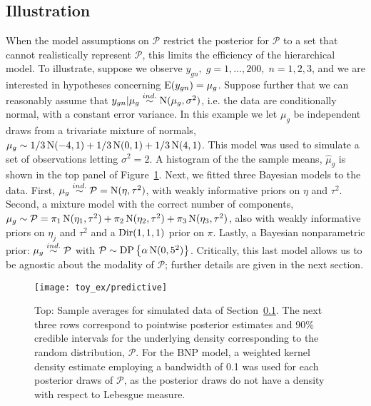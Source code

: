 \subsection{Illustration}
\label{subsec:illustration}
When the model assumptions on $\mathcal{P}$ restrict the posterior for $\mathcal{P}$ to a set that cannot realistically represent $\mathcal{P}$, this limits the efficiency of the hierarchical model. To illustrate, suppose we observe $y_{gn},\; g=1,\ldots,200,\;n=1,2,3$, and we are interested in hypotheses concerning $\operatorname{E}(y_{gn})=\mu_g$. Suppose further that we can reasonably assume that $y_{gn}|\mu_g \stackrel{ind.}{\sim} \operatorname{N}(\mu_g,\sigma^2)$, i.e. the data are conditionally normal, with a constant error variance. In this example we let $\mu_g$ be independent draws from a trivariate mixture of normals, $\mu_g \sim 1/3\operatorname{N}(-4,1)+1/3\operatorname{N}(0,1)+1/3\operatorname{N}(4,1)$. This model was used to simulate a set of observations letting $\sigma^2=2$. A histogram of the the sample means, $\hat{\mu}_g$ is shown in the top panel of Figure~\ref{predictive}. Next, we fitted three Bayesian models to the data. First, $\mu_g \stackrel{ind.}{\sim} \mathcal{P}=\operatorname{N}(\eta, \tau^2)$, with weakly informative priors on $\eta$ and $\tau^2$. Second, a mixture model with the correct number of components, $\mu_g \sim \mathcal{P}=\pi_1\operatorname{N}(\eta_1,\tau^2)+\pi_2\operatorname{N}(\eta_2,\tau^2)+\pi_3\operatorname{N}(\eta_3,\tau^2)$, also with weakly informative priors on $\eta_j$ and $\tau^2$ and a $\operatorname{Dir}(1,1,1)$ prior on $\pi$. Lastly, a Bayesian nonparametric prior: $\mu_g \stackrel{ind.}{\sim} \mathcal{P}$ with $\mathcal{P} \sim \operatorname{DP}\left\{\alpha \operatorname{N}(0,5^2)\right\}$. Critically, this last model allows us to be agnostic about the modality of $\mathcal{P}$; further details are given in the next section.

\begin{figure}[h!]
\centering
\texttt{[image: toy\_ex/predictive]}
\begin{minipage}{.7\textwidth}\small%
\caption{Top: Sample averages for simulated data of Section~\ref{subsec:illustration}. The next three rows correspond to pointwise posterior estimates and 90\% credible intervals for the underlying density corresponding to the random distribution, $\mathcal{P}$. For the BNP model, a weighted kernel density estimate employing a bandwidth of 0.1  was used for each posterior draws of $\mathcal{P}$, as the posterior draws do not have a density with respect to Lebesgue measure.}
\end{minipage}
\label{predictive}
\end{figure}


